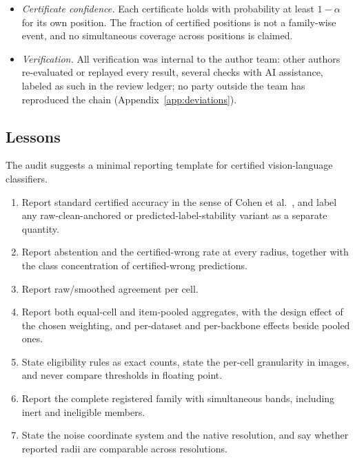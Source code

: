 \begin{itemize}
\item \textit{Certificate confidence.} Each certificate holds with probability at least $1-\alpha$ for its own position. The fraction of certified positions is not a family-wise event, and no simultaneous coverage across positions is claimed.
\item \textit{Verification.} All verification was internal to the author team: other authors re-evaluated or replayed every result, several checks with AI assistance, labeled as such in the review ledger; no party outside the team has reproduced the chain (Appendix~\ref{app:deviations}).
\end{itemize}

\subsection{Lessons}
\label{sec:lessons}

The audit suggests a minimal reporting template for certified vision-language classifiers.
\begin{enumerate}
\item Report standard certified accuracy in the sense of Cohen et al.\ \cite{cohen2019smoothing}, and label any raw-clean-anchored or predicted-label-stability variant as a separate quantity.
\item Report abstention and the certified-wrong rate at every radius, together with the class concentration of certified-wrong predictions.
\item Report raw/smoothed agreement per cell.
\item Report both equal-cell and item-pooled aggregates, with the design effect of the chosen weighting, and per-dataset and per-backbone effects beside pooled ones.
\item State eligibility rules as exact counts, state the per-cell granularity in images, and never compare thresholds in floating point.
\item Report the complete registered family with simultaneous bands, including inert and ineligible members.
\item State the noise coordinate system and the native resolution, and say whether reported radii are comparable across resolutions.
\end{enumerate}
